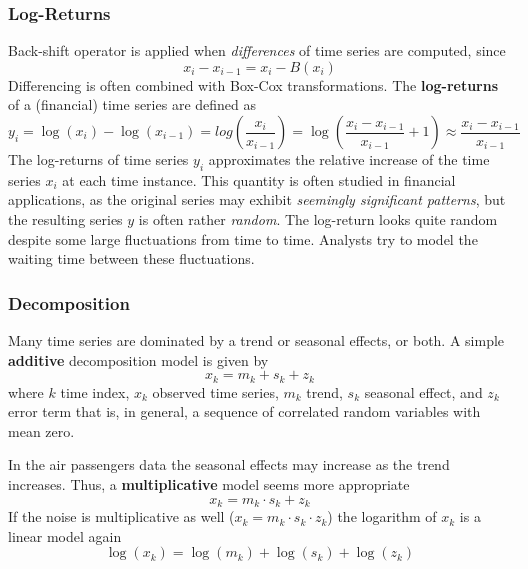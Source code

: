 \documentclass[11pt]{article}
\begin{document}
\subsubsection{Log-Returns}
Back-shift operator is applied when \emph{differences} of time series are computed, since
\begin{equation*}
	x_i - x_{i-1} = x_i - B(x_i)
\end{equation*}
Differencing is often combined with Box-Cox transformations. The \textbf{log-returns} of a (financial) time series are defined as
\begin{equation*}
	y_i = \log(x_i) - \log (x_{i-1}) = log\left(\frac{x_i}{x_{i-1}}\right) = \log\left(\frac{x_i - x_{i-1}}{x_{i-1}} + 1\right) \approx \frac{x_i - x_{i-1}}{x_{i-1}}
\end{equation*}
The log-returns of time series $y_i$ approximates the relative increase of the time series $x_i$ at each time instance. This quantity is often studied in financial applications, as the original series may exhibit \emph{seemingly significant patterns}, but the resulting series $y$ is often rather \emph{random}. The log-return looks quite random despite some large fluctuations from time to time. Analysts try to model the waiting time between these fluctuations.

\subsubsection{Decomposition}
Many time series are dominated by a trend or seasonal effects, or both. A simple \textbf{additive} decomposition model is given by
\begin{equation*}
	x_k = m_k + s_k + z_k
\end{equation*}
where $k$ time index, $x_k$ observed time series, $m_k$ trend, $s_k$ seasonal effect, and $z_k$ error term that is, in general, a sequence of correlated random variables with mean zero.

In the air passengers data the seasonal effects may increase as the trend increases. Thus, a \textbf{multiplicative} model seems more appropriate
\begin{equation*}
	x_k = m_k \cdot s_k + z_k
\end{equation*}
If the noise is multiplicative as well ($x_k = m_k \cdot s_k \cdot z_k$) the logarithm of $x_k$ is a linear model again
\begin{equation*}
	\log(x_k) = \log(m_k) + \log(s_k) + \log(z_k)
\end{equation*}
\end{document}
